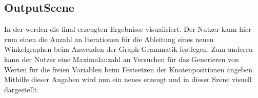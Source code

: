 \subsection{OutputScene}
In der  werden die final erzeugten Ergebnisse visualisiert. Der Nutzer kann hier zum einen die Anzahl an Iterationen für die
Ableitung eines neuen Winkelgraphen beim Anwenden der Graph-Grammatik festlegen. Zum anderen kann der Nutzer eine Maximalanzahl an Versuchen
für das Generieren von Werten für die freien Variablen beim Festsetzen der Knotenpositionen angeben. Mithilfe dieser Angaben wird nun ein
neues  erzeugt und in dieser Szene visuell dargestellt. %
